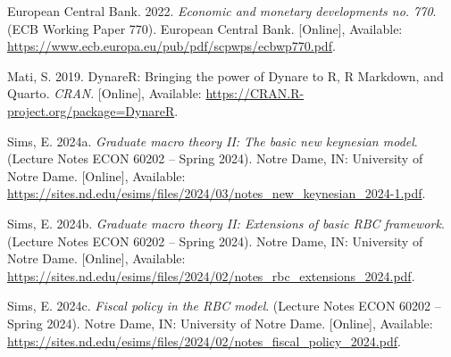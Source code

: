 \documentclass[11pt,preprint]{elsarticle}
\numberwithin{equation}{section}
\numberwithin{figure}{section}
\numberwithin{table}{section}
\newlength{\cslhangindent}
\newenvironment{CSLReferences}[2] %
{\begin{list}{}{%
	\setlength{\itemindent}{0pt}
	\setlength{\leftmargin}{0pt}
	\setlength{\parsep}{0pt}
	\ifodd #1
	\setlength{\leftmargin}{\cslhangindent}
	\setlength{\itemindent}{-1\cslhangindent}
	\fi
	\setlength{\itemsep}{#2\baselineskip}}}
{\end{list}}
\begin{document}
\label{refs}
\begin{CSLReferences}{1}{1}
European Central Bank. 2022. \emph{Economic and monetary developments
no. 770}. (ECB Working Paper 770). European Central Bank. {[}Online{]},
Available: \url{https://www.ecb.europa.eu/pub/pdf/scpwps/ecbwp770.pdf}.

Mati, S. 2019. DynareR: Bringing the power of {Dynare} to {R}, {R
Markdown}, and {Quarto}. \emph{CRAN}. {[}Online{]}, Available:
\url{https://CRAN.R-project.org/package=DynareR}.

Sims, E. 2024a. \emph{Graduate macro theory II: The basic new keynesian
model}. (Lecture Notes ECON 60202 -- Spring 2024). Notre Dame, IN:
University of Notre Dame. {[}Online{]}, Available:
\url{https://sites.nd.edu/esims/files/2024/03/notes_new_keynesian_2024-1.pdf}.

Sims, E. 2024b. \emph{Graduate macro theory II: Extensions of basic RBC
framework}. (Lecture Notes ECON 60202 -- Spring 2024). Notre Dame, IN:
University of Notre Dame. {[}Online{]}, Available:
\url{https://sites.nd.edu/esims/files/2024/02/notes_rbc_extensions_2024.pdf}.

Sims, E. 2024c. \emph{Fiscal policy in the RBC model}. (Lecture Notes
ECON 60202 -- Spring 2024). Notre Dame, IN: University of Notre Dame.
{[}Online{]}, Available:
\url{https://sites.nd.edu/esims/files/2024/02/notes_fiscal_policy_2024.pdf}.

\end{CSLReferences}


\end{document}
